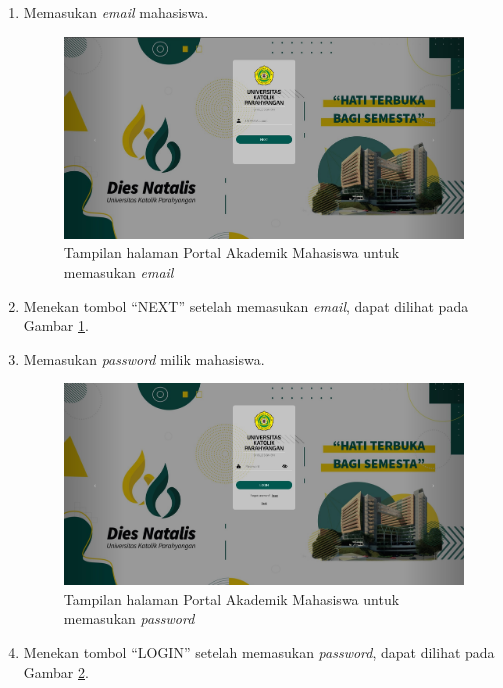 \documentclass[a4paper,twoside]{article}
\begin{document}
\begin{enumerate}
\begin{enumerate}
			\item Memasukan \textit{email} mahasiswa.
			\begin{figure}[H]
				\centering
				\includegraphics[scale=0.225]{Gambar/login.jpg}
				\caption{Tampilan halaman Portal Akademik Mahasiswa untuk memasukan \textit{email}} 
				\label{fig:login}
			\end{figure}
			\item Menekan tombol ``NEXT'' setelah memasukan \textit{email}, dapat dilihat pada Gambar \ref{fig:login}.
			
			\item Memasukan \textit{password} milik mahasiswa.
			\begin{figure}[H]
				\centering
				\includegraphics[scale=0.225]{Gambar/pass.jpg}
				\caption{Tampilan halaman Portal Akademik Mahasiswa untuk memasukan \textit{password}} 
				\label{fig:pass}
			\end{figure}
			\item Menekan tombol ``LOGIN'' setelah memasukan \textit{password}, dapat dilihat pada Gambar \ref{fig:pass}.
			

\end{enumerate}
\end{enumerate}
\end{document}
